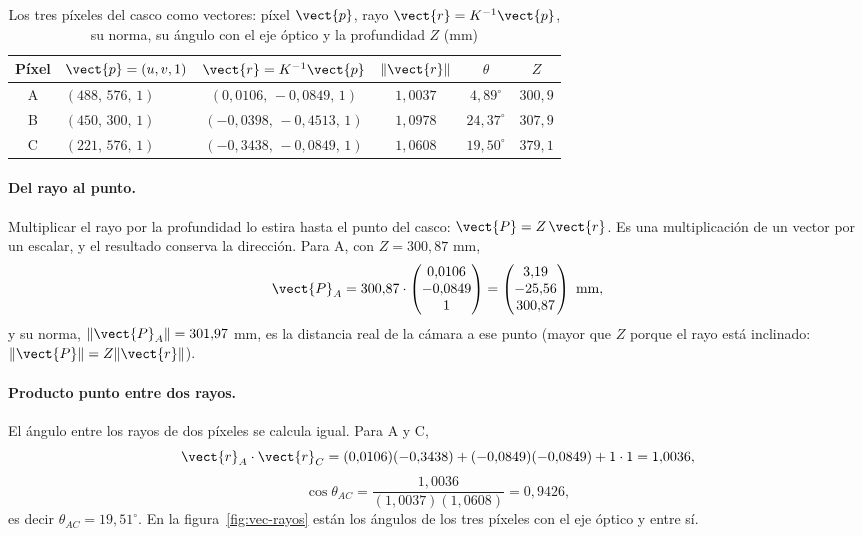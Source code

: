 \begin{table}[htbp]
\caption{Los tres píxeles del casco como vectores: píxel $\vect{p}$, rayo $\vect{r}=K^{-1}\vect{p}$, su norma, su ángulo con el eje óptico y la profundidad $Z$ (mm)}
\label{tab:rayos-casco}
\centering\small
\begin{tabular}{@{}clcccc@{}}
\toprule
Píxel & $\vect{p}=(u,v,1)$ & $\vect{r}=K^{-1}\vect{p}$ & $\lVert\vect{r}\rVert$ & $\theta$ & $Z$ \\
\midrule
A & $(488,\,576,\,1)$ & $(0{,}0106,\,-0{,}0849,\,1)$ & $1{,}0037$ & $4{,}89^\circ$ & $300{,}9$ \\
B & $(450,\,300,\,1)$ & $(-0{,}0398,\,-0{,}4513,\,1)$ & $1{,}0978$ & $24{,}37^\circ$ & $307{,}9$ \\
C & $(221,\,576,\,1)$ & $(-0{,}3438,\,-0{,}0849,\,1)$ & $1{,}0608$ & $19{,}50^\circ$ & $379{,}1$ \\
\bottomrule
\end{tabular}
\end{table}

\paragraph{Del rayo al punto.} Multiplicar el rayo por la profundidad lo estira hasta el punto del casco: $\vect{P}=Z\,\vect{r}$. Es una
multiplicación de un vector por un escalar, y el resultado conserva la dirección. Para A, con $Z=300{,}87$ mm,
\begin{equation}
\vect{P}_A=300{,}87\cdot\begin{pmatrix} 0{,}0106 \\ -0{,}0849 \\ 1 \end{pmatrix}=\begin{pmatrix} 3{,}19 \\ -25{,}56 \\ 300{,}87 \end{pmatrix}\ \text{mm},
\end{equation}
y su norma, $\lVert\vect{P}_A\rVert=301{,}97$ mm, es la distancia real de la cámara a ese punto (mayor que $Z$ porque el rayo está inclinado:
$\lVert\vect{P}\rVert=Z\lVert\vect{r}\rVert$).

\paragraph{Producto punto entre dos rayos.} El ángulo entre los rayos de dos píxeles se calcula igual. Para A y C,
\begin{equation}
\vect{r}_A\cdot\vect{r}_C=(0{,}0106)(-0{,}3438)+(-0{,}0849)(-0{,}0849)+1\cdot1=1{,}0036,
\end{equation}
\begin{equation}
\cos\theta_{AC}=\frac{1{,}0036}{(1{,}0037)(1{,}0608)}=0{,}9426,
\end{equation}
es decir $\theta_{AC}=19{,}51^\circ$. En la figura~\ref{fig:vec-rayos} están los ángulos de los tres píxeles con el eje óptico y entre sí.

